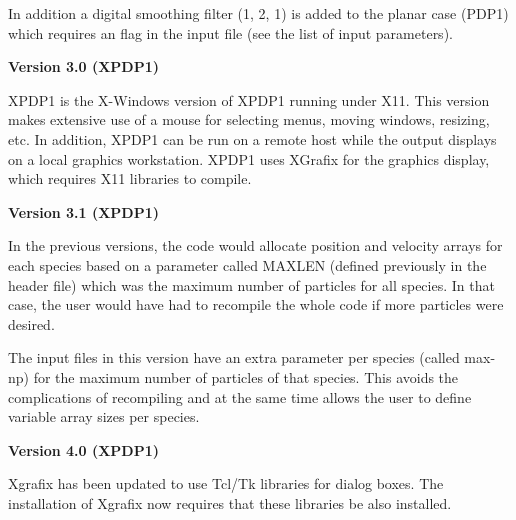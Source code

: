 \begin{section}
\begin{subsection}
\begin{subsubsection}
\noindent
      In addition a digital smoothing filter (1, 2, 1) is added to the planar
      case (PDP1) which requires an flag in the input file (see the list of
      input parameters).
\end{subsubsection}

\begin{subsubsection}
{\bf Version 3.0 (XPDP1)}

      XPDP1 is the X-Windows version of XPDP1 running under X11.  This version
      makes extensive use of a mouse for selecting menus, moving windows,
      resizing, etc.  In addition, XPDP1 can be run on a remote host while the
      output displays on a local graphics workstation.  XPDP1 uses XGrafix for
      the graphics display, which requires X11 libraries to compile.
\end{subsubsection}

\begin{subsubsection}
{\bf Version 3.1 (XPDP1)}

      In the previous versions, the code would allocate position and velocity
      arrays for each species based on a parameter called MAXLEN (defined
      previously in the header file) which was the maximum number of particles
      for all species.  In that case, the user would have had to recompile the
      whole code if more particles were desired.
\vspace{.2in}

\noindent
      The input files in this version have an extra parameter per species
      (called max-np) for the maximum number of particles of that species.
      This avoids the complications of recompiling and at the same time allows
      the user to define variable array sizes per species.
\end{subsubsection}

\begin{subsubsection}
{\bf Version 4.0 (XPDP1)}

      Xgrafix has been updated to use Tcl/Tk libraries for dialog boxes. 
      The installation of Xgrafix now requires that these libraries be
      also installed.
\vspace{.2in}


\end{subsubsection}
\end{subsection}
\end{section}
